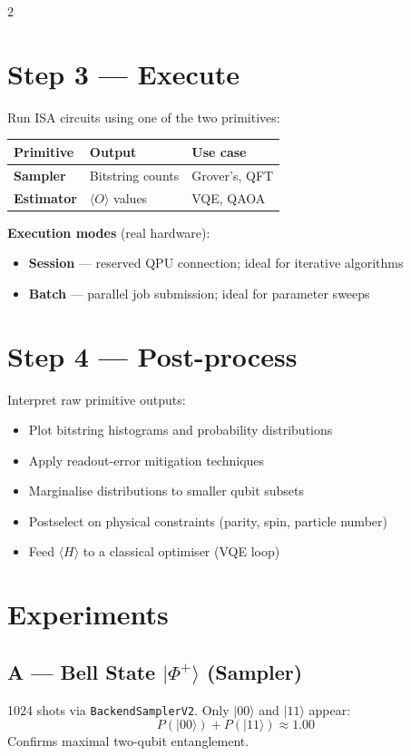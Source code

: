 ﻿\documentclass[10pt, a4paper]{article}
\begin{document}
\begin{multicols}{2}
\section{Step 3 --- Execute}
Run ISA circuits using one of the two primitives:
\begin{center}
\renewcommand{\arraystretch}{1.15}
\begin{tabular}{p{1.7cm}p{2.1cm}p{1.5cm}}
\toprule
\textbf{Primitive} & \textbf{Output} & \textbf{Use case}\\
\midrule
\textbf{Sampler}   & Bitstring counts & Grover's, QFT\\
\textbf{Estimator} & $\langle O\rangle$ values & VQE, QAOA\\
\bottomrule
\end{tabular}
\end{center}
\noindent\textbf{Execution modes} (real hardware):
\begin{itemize}
  \item \textbf{Session} --- reserved QPU connection; ideal for iterative algorithms
  \item \textbf{Batch} --- parallel job submission; ideal for parameter sweeps
\end{itemize}

\section{Step 4 --- Post-process}
Interpret raw primitive outputs:
\begin{itemize}
  \item Plot bitstring histograms and probability distributions
  \item Apply readout-error mitigation techniques
  \item Marginalise distributions to smaller qubit subsets
  \item Postselect on physical constraints (parity, spin, particle number)
  \item Feed $\langle H\rangle$ to a classical optimiser (VQE loop)
\end{itemize}

\section{Experiments}
\subsection{A --- Bell State $|\Phi^+\rangle$ (Sampler)}
1024 shots via \texttt{BackendSamplerV2}. Only $|00\rangle$ and $|11\rangle$ appear:
\[P(|00\rangle)+P(|11\rangle)\approx 1.00\]
Confirms maximal two-qubit entanglement.


\end{multicols}
\end{document}
